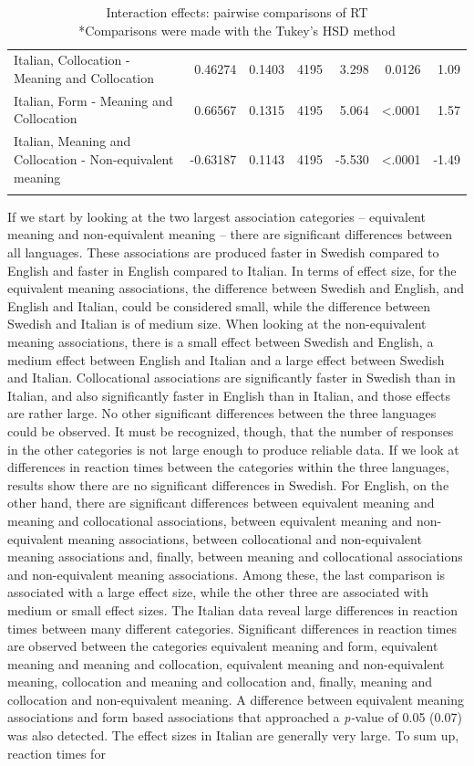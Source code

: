 \documentclass[output=paper,colorlinks,citecolor=brown,nonflat]{langsci/langscibook}
\begin{document}
\begin{table}
\begin{tabularx}{\textwidth}{Qrrrrrr}
        Italian, Collocation - Meaning and Collocation & 0.46274 & 0.1403 & 4195 & 3.298 & 0.0126 & 1.09\\
        Italian, Form - Meaning and Collocation & 0.66567 & 0.1315 & 4195 & 5.064 & <.0001 & 1.57\\
        Italian, Meaning and Collocation - Non-equivalent meaning & {}-0.63187 & 0.1143 & 4195 & {}-5.530 & <.0001 & {}-1.49\\
    \lspbottomrule
    \end{tabularx}
    \caption{Interaction effects: pairwise comparisons of RT\\
    *Comparisons were made with the Tukey’s HSD method}
    \label{tab:gudmundson:5}
\end{table}

If we start by looking at the two largest association categories – equivalent meaning and non-equivalent meaning – there are significant differences between all languages. These associations are produced faster in Swedish compared to English and faster in English compared to Italian. In terms of effect size, for the equivalent meaning associations, the difference between Swedish and English, and English and Italian, could be considered small, while the difference between Swedish and Italian is of medium size. When looking at the non-equivalent meaning associations, there is a small effect between Swedish and English, a medium effect between English and Italian and a large effect between Swedish and Italian. Collocational associations are significantly faster in Swedish than in Italian, and also significantly faster in English than in Italian, and those effects are rather large. No other significant differences between the three languages could be observed. It must be recognized, though, that the number of responses in the other categories is not large enough to produce reliable data. If we look at differences in reaction times between the categories within the three languages, results show there are no significant differences in Swedish. For English, on the other hand, there are significant differences between equivalent meaning and meaning and collocational associations, between equivalent meaning and non-equivalent meaning associations, between collocational and non-equivalent meaning associations and, finally, between meaning and collocational associations and non-equivalent meaning associations. Among these, the last comparison is associated with a large effect size, while the other three are associated with medium or small effect sizes. The Italian data reveal large differences in reaction times between many different categories. Significant differences in reaction times are observed between the categories equivalent meaning and form, equivalent meaning and meaning and collocation, equivalent meaning and non-equivalent meaning, collocation and meaning and collocation and, finally, meaning and collocation and non-equivalent meaning. A difference between equivalent meaning associations and form based associations that approached a \textit{p-}value of 0.05 (0.07) was also detected.  The effect sizes in Italian are generally very large. To sum up, reaction times for 
\end{document}
